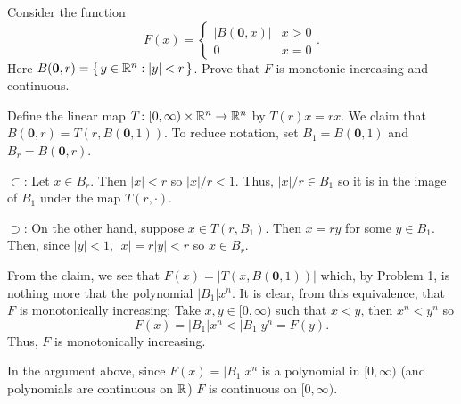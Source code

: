 \begin{problem}
  Consider the function
  \[
    F(x)=
    \begin{cases}
      |B(\mathbf{0},x)|&x>0\\
      0&x=0
    \end{cases}.
  \]
  Here $B(\mathbf{0},r)=\left\{\, y \in\mathbb{R}^n:| y |<r\,\right\}$. Prove
  that $F$ is monotonic increasing and continuous.
\end{problem}
\begin{solution}
  Define the linear map $T\colon[0,\infty)\times\mathbb{R}^n\to\mathbb{R}^n$ by
  $T(r) x = rx $. We claim that
  $B(\mathbf{0},r)=T(r,B(\mathbf{0},1))$. To reduce notation, set
  $B_1= B(\mathbf{0},1)$ and $B_r= B(\mathbf{0},r)$.
  \begin{solution}
    $\subset$: Let $x\in B_r$. Then $|x |<r$ so $|x |/r<1$. Thus,
    $|x |/r\in B_1$ so it is in the image of $B_1$ under the map
    $T(r,\cdot)$.

    $\supset$: On the other hand, suppose $x\in T(r,B_1)$. Then
    $x =r y $ for some $ y \in B_1$. Then, since $| y |<1$,
    $|x |=r| y |<r$ so $x\in B_r$.
  \end{solution}

  From the claim, we see that $F(x)=|T(x,B(\mathbf{0},1))|$ which, by
  Problem 1, is nothing more that the polynomial $|B_1|x^n$. It is clear,
  from this equivalence, that $F$ is monotonically increasing: Take
  $x,y\in[0,\infty)$ such that $x<y$, then $x^n<y^n$ so
  \begin{equation}
    \label{eq:prep:1:7}
    F(x)=|B_1|x^n<|B_1|y^n=F(y).
  \end{equation}
  Thus, $F$ is monotonically increasing.

  In the argument above, since $F(x)=|B_1|x^n$ is a polynomial in
  $[0,\infty)$ (and polynomials are continuous on $\mathbb{R}$) $F$ is continuous
  on $[0,\infty)$.
\end{solution}

